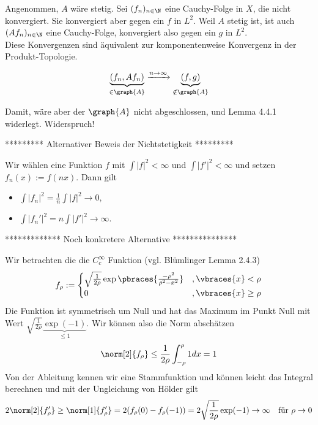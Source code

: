 \begin{solution}
\begin{enumerate}
\begin{itemize}
    Angenommen, $A$ wäre stetig.
    Sei $(f_n)_{n \in \N}$ eine Cauchy-Folge in $X$, die nicht konvergiert.
    Sie konvergiert aber gegen ein $f$ in $L^2$.
    Weil $A$ stetig ist, ist auch $(A f_n)_{n \in \N}$ eine Cauchy-Folge, konvergiert also gegen ein $g$ in $L^2$. \\

    Diese Konvergenzen sind äquivalent zur komponentenweise Konvergenz in der Produkt-Topologie.

    \begin{align*}
      \underbrace{(f_n, A f_n)}_{\in \graph{A}}
      \xrightarrow{n \to \infty}
      \underbrace{(f, g)}_{\notin \graph{A}}
    \end{align*}

    Damit, wäre aber der $\graph{A}$ nicht abgeschlossen, und Lemma 4.4.1 widerlegt.
    Widerspruch!
    \FloatBarrier
  \end{itemize}

  ********* Alternativer Beweis der Nichtstetigkeit *********

Wir wählen eine Funktion $f$ mit $\int |f|^2 < \infty$ und $\int |f'|^2 < \infty$ und setzen $f_n(x) := f(nx).$ Dann gilt
\begin{itemize}
    \item $\int |f_n|^2 = \frac{1}{n} \int |f|^2 \longrightarrow 0,$
    \item $\int|f_n'|^2 = n \int |f'|^2 \longrightarrow \infty.$
\end{itemize}

  ************* Noch konkretere Alternative ***************

  Wir betrachten die die $C_c^\infty$ Funktion (vgl. Blümlinger Lemma 2.4.3)
  \begin{align*}
    f_\rho := 
    \begin{cases}
      \sqrt{\frac{1}{2\rho}}\exp\pbraces{\frac{- \rho^2}{\rho^2 - x^2}} &, \vbraces{x} < \rho \\
      0 &, \vbraces{x} \geq \rho
    \end{cases}
  \end{align*}
  Die Funktion ist symmetrisch um Null und hat das Maximum im Punkt Null mit Wert $\sqrt{\frac{1}{2\rho}} \underbrace{\exp(-1)}_{\leq 1}$. Wir können also die Norm abschätzen
  \begin{align*}
    \norm[2]{f_\rho} \leq \frac{1}{2\rho} \int_{-\rho}^\rho 1 dx = 1
  \end{align*}
  Von der Ableitung kennen wir eine Stammfunktion und können leicht das Integral berechnen und mit der Ungleichung von Hölder gilt
  \begin{align*}
    2\norm[2]{f_\rho^\prime} \geq \norm[1]{f_\rho^\prime} = 2(f_\rho(0) - f_\rho(-1)) = 2 \sqrt\frac{1}{2\rho} \exp(-1) \to \infty \quad \textrm{für $\rho \to 0$}
  \end{align*}

\end{enumerate}

\end{solution}
